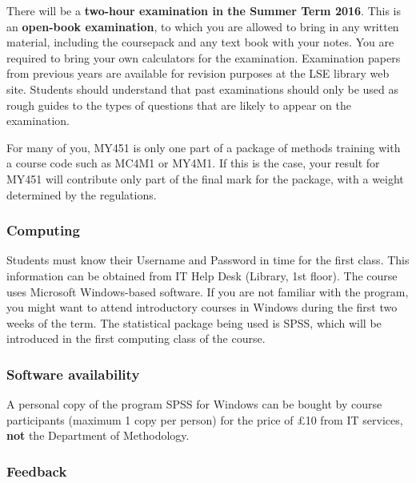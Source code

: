 \vspace*{-2ex}
There will be a \textbf{two-hour examination in the Summer Term 2016}.
This is an \textbf{open-book examination}, to which you are allowed to
bring in any written material, including the coursepack and any text
book with your notes. You are required to bring your own calculators for
the examination. Examination papers from previous years are available
for revision purposes at the LSE library web site. Students should
understand that past examinations should only be used as rough guides to
the types of questions that are likely to appear on the examination.

For many of you, MY451 is only one part of a package of methods training
with a course code such as MC4M1 or MY4M1. If this is the case, your
result for MY451 will contribute only part of the final mark for the
package, with a weight determined by the regulations.

\vspace*{-1ex}
\subsubsection{Computing}

\vspace*{-2ex}
Students must know their Username and Password in time for the first
class.  This information can be obtained from IT Help Desk (Library, 1st
floor).  The course uses Microsoft Windows-based software.
If you are not familiar with the program, you might want to
attend introductory
courses in Windows during the first two weeks of the term.
The statistical package being used is SPSS, which will be
introduced in the first computing class of the course.

\vspace*{-1ex}
\subsubsection{Software availability}

\vspace*{-2ex}
A personal copy of the program SPSS for Windows can be bought by course
participants (maximum 1 copy per person) for the price of
\pounds10
from IT services, \textbf{not} the Department of Methodology.

\vspace*{-1ex}
\subsubsection{Feedback}

